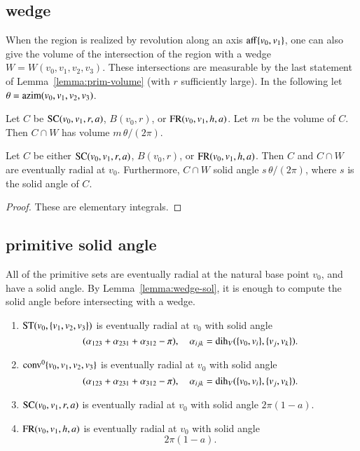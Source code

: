 \subsection{wedge}\label{sec:wedge}

When the region is realized by revolution along an axis ${\operatorname{aff}}\{v_0,v_1\}$, 
one can also give the volume of the intersection of the region
with a wedge $W=W(v_0,v_1,v_2,v_3)$.  These intersections are measurable
by the last statement of Lemma~\ref{lemma:prim-volume} (with $r$ sufficiently
large).
  In the following
let $\theta = {\operatorname{azim}}(v_0,v_1,v_2,v_3)$.

\begin{lemma}  Let $C$ be ${\operatorname{SC}}(v_0,v_1,r,a)$, $B(v_0,r)$, or
   ${\operatorname{FR}}(v_0,v_1,h,a)$.  Let $m$ be the volume of $C$.  
   Then $C\cap W$ has volume $m\,\theta/(2\pi)$.   
\end{lemma}

\begin{lemma}  Let $C$ be either ${\operatorname{SC}}(v_0,v_1,r,a)$, $B(v_0,r)$, or
   ${\operatorname{FR}}(v_0,v_1,h,a)$.  Then $C$ and $C\cap W$ are eventually 
radial at $v_0$. Furthermore,
    $C\cap W$ solid angle 
  $s\,\theta/(2\pi)$, where $s$ is the solid angle of $C$.
\end{lemma}


\begin{proof}
These are elementary integrals.
\end{proof}


\subsection{primitive solid angle}

All of the primitive sets are eventually radial at the natural
base point $v_0$, and have a
solid angle.  By Lemma~\ref{lemma:wedge-sol}, it is enough to compute
the solid angle before intersecting with a wedge.

\begin{lemma} 
\begin{enumerate}
    \item  ${\operatorname{ST}}(v_0,\{v_1,v_2,v_3\})$ is eventually radial at $v_0$
     with solid angle 
     $$
     (\alpha_{123}+\alpha_{231}+\alpha_{312}-\pi),\quad
     \alpha_{ijk}=\operatorname{dih}_V(\{v_0,v_i\},\{v_j,v_k\}).
     $$
    \item ${\operatorname{conv}}^0\{v_0,v_1,v_2,v_3\}$ is eventually radial at $v_0$
      with solid angle
           $$
     (\alpha_{123}+\alpha_{231}+\alpha_{312}-\pi),\quad
     \alpha_{ijk}=\operatorname{dih}_V(\{v_0,v_i\},\{v_j,v_k\}).
     $$
    \item ${\operatorname{SC}}(v_0,v_1,r,a)$ is eventually radial at $v_0$ with solid
      angle 
      $2\pi(1-a)$.
    \item ${\operatorname{FR}}(v_0,v_1,h,a)$ is eventually radial at $v_0$ with solid
      angle
        $$
        2\pi (1-a).
        $$
\end{enumerate}
\end{lemma}

